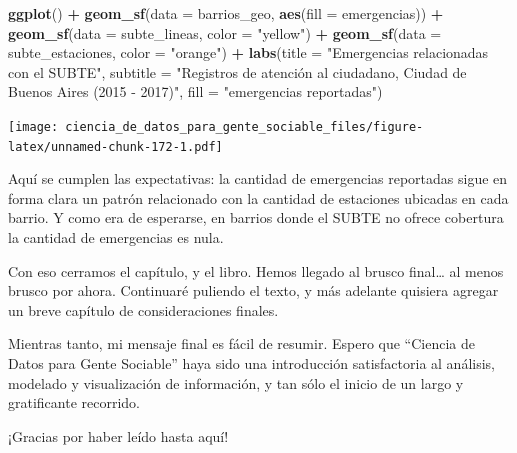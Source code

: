 \documentclass[]{book}
\newenvironment{Shaded}{\begin{snugshade}}{\end{snugshade}}
\newcommand{\KeywordTok}[1]{\textcolor[rgb]{0.13,0.29,0.53}{\textbf{#1}}}
\newcommand{\DataTypeTok}[1]{\textcolor[rgb]{0.13,0.29,0.53}{#1}}
\newcommand{\StringTok}[1]{\textcolor[rgb]{0.31,0.60,0.02}{#1}}
\newcommand{\OperatorTok}[1]{\textcolor[rgb]{0.81,0.36,0.00}{\textbf{#1}}}
\newcommand{\NormalTok}[1]{#1}
\begin{document}
\begin{Shaded}
\begin{Highlighting}[]
\KeywordTok{ggplot}\NormalTok{() }\OperatorTok{+}
\StringTok{    }\KeywordTok{geom_sf}\NormalTok{(}\DataTypeTok{data =}\NormalTok{ barrios_geo, }\KeywordTok{aes}\NormalTok{(}\DataTypeTok{fill =}\NormalTok{ emergencias)) }\OperatorTok{+}
\StringTok{    }\KeywordTok{geom_sf}\NormalTok{(}\DataTypeTok{data =}\NormalTok{ subte_lineas, }\DataTypeTok{color =} \StringTok{"yellow"}\NormalTok{) }\OperatorTok{+}
\StringTok{    }\KeywordTok{geom_sf}\NormalTok{(}\DataTypeTok{data =}\NormalTok{ subte_estaciones, }\DataTypeTok{color =} \StringTok{"orange"}\NormalTok{) }\OperatorTok{+}
\StringTok{    }\KeywordTok{labs}\NormalTok{(}\DataTypeTok{title =} \StringTok{"Emergencias relacionadas con el SUBTE"}\NormalTok{,}
         \DataTypeTok{subtitle =} \StringTok{"Registros de atención al ciudadano, Ciudad de Buenos Aires (2015 - 2017)"}\NormalTok{,}
         \DataTypeTok{fill =} \StringTok{"emergencias reportadas"}\NormalTok{)}
\end{Highlighting}
\end{Shaded}

\texttt{[image: ciencia\_de\_datos\_para\_gente\_sociable\_files/figure-latex/unnamed-chunk-172-1.pdf]}

Aquí se cumplen las expectativas: la cantidad de emergencias reportadas
sigue en forma clara un patrón relacionado con la cantidad de estaciones
ubicadas en cada barrio. Y como era de esperarse, en barrios donde el
SUBTE no ofrece cobertura la cantidad de emergencias es nula.

Con eso cerramos el capítulo, y el libro. Hemos llegado al brusco
final\ldots{} al menos brusco por ahora. Continuaré puliendo el texto, y
más adelante quisiera agregar un breve capítulo de consideraciones
finales.

Mientras tanto, mi mensaje final es fácil de resumir. Espero que
``Ciencia de Datos para Gente Sociable'' haya sido una introducción
satisfactoria al análisis, modelado y visualización de información, y
tan sólo el inicio de un largo y gratificante recorrido.

¡Gracias por haber leído hasta aquí!


\end{document}
